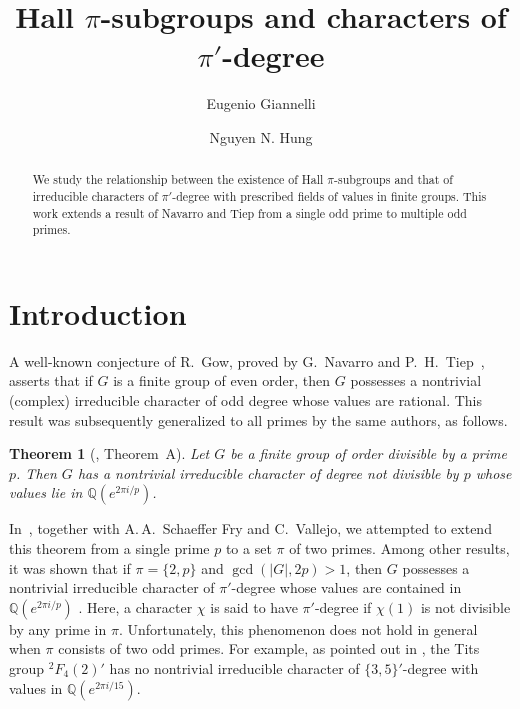 \documentclass[12pt]{amsart}
\title[Hall $\pi$-subgroups and characters of $\pi'$-degree]{%
Hall $\pi$-subgroups and characters of $\pi'$-degree%
}
\author[Eugenio Giannelli]{Eugenio Giannelli}
\author[Nguyen N. Hung]{Nguyen N. Hung}
\newtheorem{theorem}{Theorem}[section]
\theoremstyle{definition}
\numberwithin{equation}{section}
\newcommand{\QQ}{{\mathbb Q}}
\begin{document}
\begin{abstract}
We study the relationship between the existence %
of Hall
$\pi$-subgroups and %
that of irreducible characters of $\pi'$-degree
with prescribed fields of values in finite groups. This work extends
a result of Navarro and Tiep from a single odd prime to multiple odd
primes.
\end{abstract}

\maketitle



\section{Introduction}

A well-known conjecture of R.~Gow, proved by G.~Navarro and
P.~H.~Tiep~\cite{Navarro-Tiep2}, asserts that if $G$ is a finite
group of even order, then $G$ possesses a nontrivial (complex)
irreducible character of odd degree whose values are rational. This
result was subsequently generalized to all primes by the same
authors, as %
follows.

\begin{theorem}[\cite{Navarro-Tiep1}, Theorem~A]\label{thm:Navarro-Tiep}
Let %
$G$ be a finite group of order divisible by a prime $p$. Then
$G$ has a nontrivial irreducible character of degree not divisible
by $p$ whose values lie in $\QQ(e^{2\pi i/p})$.
\end{theorem}

In~\cite{GHSV21}, together with A.\,A.~Schaeffer Fry and C.~Vallejo,
we attempted to extend this theorem from a single prime $p$ to a set
$\pi$ of two primes. Among other results, it was shown that if
$\pi=\{2,p\}$ and $\gcd(|G|,2p)>1$, then $G$ possesses a nontrivial
irreducible character of $\pi'$-degree whose values are contained in
$\QQ(e^{2\pi i/p})$%
. Here, a %
character $\chi$ is said to have
$\pi'$-degree if $\chi(1)$ is not divisible by any prime in %
$\pi$.
Unfortunately, %
this phenomenon does not hold in general when $\pi$
consists of two odd primes. For example, as pointed out in
\cite[Proposition~4.1]{GHSV21}, the Tits group ${}^2F_4(2)'$ has no
nontrivial irreducible character of $\{3,5\}'$-degree with values in
$\QQ(e^{2\pi i/15})$.
\end{document}
